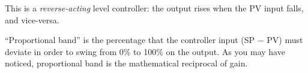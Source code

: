 





This is a {\it reverse-acting} level controller: the output rises when the PV input falls, and vice-versa.

\vskip 10pt

``Proportional band'' is the percentage that the controller input (SP $-$ PV) must deviate in order to swing from 0\% to 100\% on the output.  As you may have noticed, proportional band is the mathematical reciprocal of gain.












